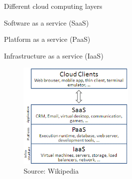 \begin{frame}{Different cloud computing layers}
\BI
\item Software as a service (SaaS)
\item Platform as a service (PaaS)
\item Infrastructure as a service (IaaS)
\EI

\begin{figure}
\includegraphics[width=0.5\textwidth]{figs/02/cloud_computing_layers.png}	
\caption{Source: Wikipedia}
\end{figure}


\end{frame}

